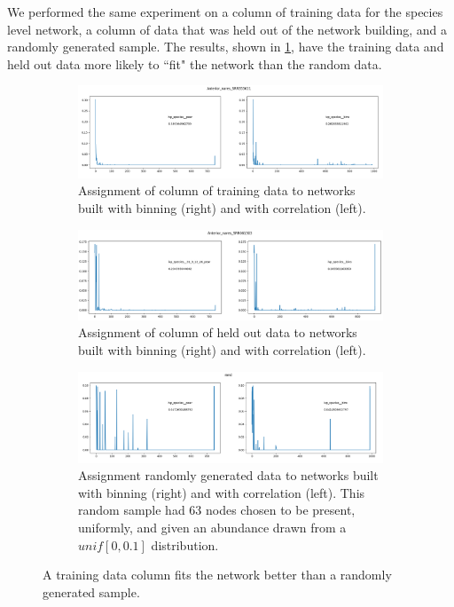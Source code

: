 \documentclass[10pt]{article}
\theoremstyle{definition}
\numberwithin{theorem}{section}
\numberwithin{definition}{section}
\numberwithin{lemma}{section}
\numberwithin{corollary}{section}
\numberwithin{clm}{section}
\numberwithin{rmk}{section}
\begin{document}
We performed the same experiment on a column of training data for the species level network, a column of data that was held out of the network building, and a randomly generated sample. The results, shown in \cref{full_assign}, have the training data and held out data more likely to ``fit" the network than the random data.

\begin{figure}
	\begin{subfigure}[b]{0.9\linewidth}
		\begin{center}
			\includegraphics[scale = 0.45]{../a_nares.png}	
		\end{center}
		\caption{Assignment of column of training data to networks built with binning (right) and with correlation (left).}
	\end{subfigure}
	\begin{subfigure}[b]{0.9\linewidth}
		\begin{center}
			\includegraphics[scale = 0.45]{../hldouts.png}	
		\end{center}
		\caption{Assignment of column of held out data to networks built with binning (right) and with correlation (left).}
	\end{subfigure}
	\begin{subfigure}[b]{0.9\linewidth}
		\begin{center}
			\includegraphics[scale = 0.45]{../random.png}	
		\end{center}
		\caption{Assignment randomly generated data to networks built with binning (right) and with correlation (left). This random sample had 63 nodes chosen to be present, uniformly, and given an abundance drawn from a $unif[0,0.1]$ distribution.}
	\end{subfigure}
	\caption{A training data column fits the network better than a randomly generated sample.}\label{full_assign}
\end{figure}
\end{document}
